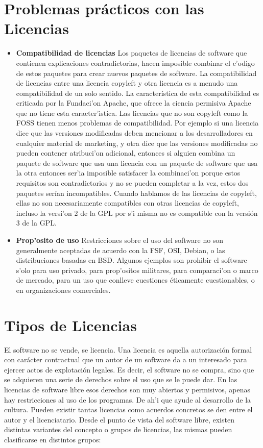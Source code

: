 \section {Problemas pr\'acticos con las Licencias}
\begin{itemize}
	\item {\bf Compatibilidad de licencias}
Los paquetes de licencias de software que contienen explicaciones contradictorias, hacen imposible combinar el c'odigo de estos paquetes para crear nuevos paquetes de software. La compatibilidad de licencias entre una licencia copyleft y otra licencia es a menudo una compatibilidad de un solo sentido. La característica de esta compatibilidad es criticada por la Fundaci'on Apache, que ofrece la ciencia permisiva Apache que no tiene esta caracter'istica. Las licencias que no son copyleft como la FOSS tienen menos problemas de compatibilidad. Por ejemplo si una licencia dice que las versiones modificadas deben mencionar a los desarrolladores en cualquier material de marketing, y otra dice que las versiones modificadas no pueden contener atribuci'on adicional, entonces si alguien combina un paquete de software que usa una licencia con un paquete de software que usa la otra entonces ser'ia imposible satisfacer la combinaci'on porque estos requisitos son contradictorios y no se pueden completar a la vez, estos dos paquetes serían incompatibles. Cuando hablamos de las licencias de copyleft, ellas no son necesariamente compatibles con otras licencias de copyleft, incluso la versi'on 2 de la GPL por s'i misma no es compatible con la versión 3 de la GPL.
	\item {\bf Prop'osito de uso}
Restricciones sobre el uso del software no son generalmente aceptadas de acuerdo con la FSF, OSI, Debian, o las distribuciones basadas en BSD. Algunos ejemplos son prohibir el software s'olo para uso privado, para prop'ositos militares, para comparaci'on o marco de mercado, para un uso que conlleve cuestiones éticamente cuestionables, o en organizaciones comerciales.
\end{itemize}
\newpage
\section {Tipos de Licencias}
El software no se vende, se licencia. Una licencia es aquella autorización formal con carácter contractual que un autor de un software da a un interesado para ejercer actos de explotación legales. Es decir, el software no se compra, sino que se adquieren una serie de derechos sobre el uso que se le puede dar. En las licencias de software libre esos derechos son muy abiertos y permisivos, apenas hay restricciones al uso de los programas. De ah'i que ayude al desarrollo de la cultura. Pueden existir tantas licencias como acuerdos concretos se den entre el autor y el licenciatario. Desde el punto de vista del software libre, existen distintas variantes del concepto o grupos de licencias, las mismas pueden clasificarse en distintos grupos:\\


